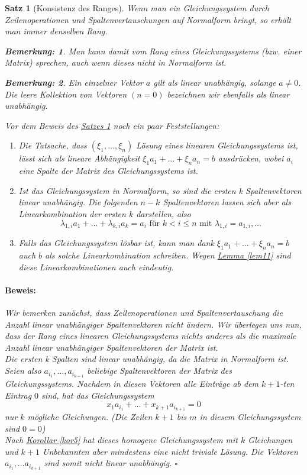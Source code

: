 \documentclass{report}
\newcommand{\lb}{\lambda}
\theoremstyle{customrem}
\newtheorem*{bem}{Bemerkung\textnormal:}
\theoremstyle{customdef}
\newtheorem{satz}[definition]{Satz}
\renewenvironment{proof}{\vspace{-.75cm}\paragraph{Beweis: }}{\vspace{-.5cm}\hfill$\square$}
\begin{document}
	\begin{satz}[Konsistenz des Ranges]
		\label{satz12}
		Wenn man ein Gleichungssystem durch Zeilenoperationen und Spaltenvertauschungen auf Normalform bringt, so erhält man immer denselben Rang.		
		\begin{bem}
			Man kann damit vom Rang eines Gleichungssystems (bzw. einer Matrix) sprechen, auch wenn dieses nicht in Normalform ist.
		\end{bem}
		\begin{bem}
			Ein einzelner Vektor $a$ gilt als linear unabhängig, solange $a \neq 0$. Die leere Kollektion von Vektoren $(n=0)$ bezeichnen wir ebenfalls als linear unabhängig.
		\end{bem}
		\noindent Vor dem Beweis des \hyperref[satz12]{Satzes \ref{satz12}} noch ein paar Feststellungen:
		\begin{enumerate}
			\item Die Tatsache, dass $(\xi_1, \dots, \xi_n)$ Lösung eines linearen Gleichungssystems ist, lässt sich als lineare Abhängigkeit 
			$\xi_1a_1 + \dots + \xi_n a_n = b$ ausdrücken, wobei $a_i$ eine Spalte der Matrix des Gleichungssystems ist.
			\item Ist das Gleichungssystem in Normalform, so sind die ersten k Spaltenvektoren linear unabhängig. Die folgenden $n-k$ Spaltenvektoren lassen sich aber als Linearkombination der ersten $k$ darstellen, also
			$$
			\lb_{1,i}a_1 + \dots + \lb_{k,i}a_k = a_i \text{ für } k < i \le n
			 \text{ mit }  \lb_{1,i} = a_{1,i}, \dots
			$$
			\item Falls das Gleichungssystem lösbar ist, kann man dank $\xi_1a_1 + \dots + \xi_n a_n = b$ auch $b$ als solche Linearkombination schreiben. Wegen \hyperref[lem11]{Lemma \ref{lem11}} sind diese Linearkombinationen auch eindeutig.
		\end{enumerate}
		\begin{proof}
			Wir bemerken zunächst, dass Zeilenoperationen und Spaltenvertauschung die Anzahl linear unabhängiger Spaltenvektoren nicht ändern.
			Wir überlegen uns nun, dass der Rang eines linearen Gleichungssystems nichts anderes als die maximale Anzahl linear unabhängiger Spaltenvektoren der Matrix ist.\\
			Die ersten k Spalten sind linear unabhängig, da die Matrix in Normalform ist. Seien also $a_{i_1}, \dots, a_{i_{k+1}}$ beliebige Spaltenvektoren der Matrix des Gleichungssystems. Nachdem in diesen Vektoren alle Einträge ab dem $k+1$-ten Eintrag $0$ sind, hat das Gleichungssystem \\
			$$
			x_1a_{i_1} + \dots + x_{k+1}a_{i_{k+1}} = 0
			$$
			nur $k$ mögliche Gleichungen. (Die Zeilen $k+1$ bis $m$ in diesem Gleichungssystem sind $0=0$)\\
			Nach \hyperref[kor5]{Korollar \ref{kor5}} hat dieses homogene Gleichungssystem mit $k$ Gleichungen und $k+1$ Unbekannten aber mindestens eine nicht triviale Lösung. Die Vektoren $a_{i_1}, \dots a_{i_{k+1}}$ sind somit nicht linear unabhängig.
		\end{proof}
	\end{satz}
\end{document}
